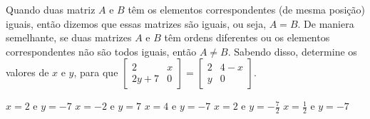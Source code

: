 Quando duas matriz $A$ e $B$ têm os elementos correspondentes (de mesma posição) iguais, então dizemos que essas matrizes são iguais, ou seja, $A=B$. De maniera semelhante, se duas matrizes $A$ e $B$ têm ordens diferentes ou os elementos correspondentes não são todos iguais, então $A\neq B$. Sabendo disso, determine os valores de $x$ e $y$, para que $\left[ \begin{array}{cc}
2 & x \\
2y+7 & 0
\end{array} \right] = \left[ \begin{array}{cc}
2 & 4-x \\
y & 0
\end{array} \right]$.

$x=2$ e $y=-7$
$x=-2$ e $y=7$
$x=4$ e $y=-7$
$x=2$ e $y=-\frac{7}{2}$
$x=\frac{1}{2}$ e $y=-7$



